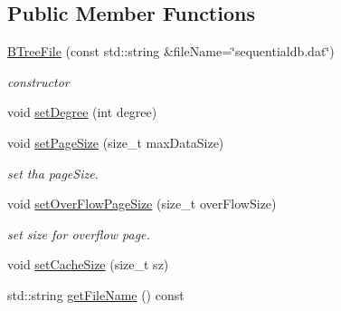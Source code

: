 \subsection*{Public Member Functions}
\begin{CompactItemize}
\item 
\hyperlink{classBTreeFile_5609875a43e3c7e70229ac4215aafaff}{BTreeFile} (const std::string \&fileName=\char`\"{}sequentialdb.dat\char`\"{})
\begin{CompactList}\small\item\em constructor \item\end{CompactList}\item 
void \hyperlink{classBTreeFile_76116d6e74ebdd94b641e60466454da5}{setDegree} (int degree)
\item 
void \hyperlink{classBTreeFile_b158c5e0ae96fd9cfb74813f984c1117}{setPageSize} (size\_\-t maxDataSize)
\begin{CompactList}\small\item\em set tha pageSize. \item\end{CompactList}\item 
\hypertarget{classBTreeFile_caec90f215e9695158269c82364d735b}{
void \hyperlink{classBTreeFile_caec90f215e9695158269c82364d735b}{setOverFlowPageSize} (size\_\-t overFlowSize)}
\label{classBTreeFile_caec90f215e9695158269c82364d735b}

\begin{CompactList}\small\item\em set size for overflow page. \item\end{CompactList}\item 
void \hyperlink{classBTreeFile_5a758e56495e400540e2829601e06de7}{setCacheSize} (size\_\-t sz)
\item 
\hypertarget{classBTreeFile_77fbd3babf6b5c990022c23569bb8495}{
std::string \hyperlink{classBTreeFile_77fbd3babf6b5c990022c23569bb8495}{getFileName} () const }
\label{classBTreeFile_77fbd3babf6b5c990022c23569bb8495}


\end{CompactItemize}
